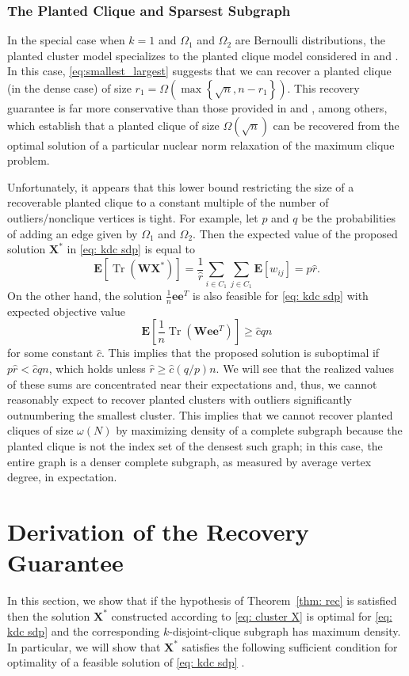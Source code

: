 \documentclass[twoside,11pt]{article}
\newcommand{\E}{\mathbf{E}}
\DeclareMathOperator{\tr}{{Tr}}
\newcommand{\e}{\bs {e}}
\newcommand{\bs}{\boldsymbol}
\newcommand{\X}{\bs {X}}
\newcommand{\W}{\bs {W}}
\newcommand{\0}{\bs{0}}
\newcommand{\sbra}[1] {\ensuremath{ \left[ #1\right]}} %
\newcommand{\rbra}[1]{\ensuremath{\left( #1 \right)}} %
\newcommand{\bra}[1]{\ensuremath{\left\{ #1 \right\}}} %
\newcommand{\kdc}{\(k\)-disjoint-clique }
\begin{document}
{\subsubsection{The Planted Clique and Sparsest Subgraph}

In the special case when $k=1$ and $\Omega_1$ and $\Omega_2$
are Bernoulli distributions, the planted cluster model 
specializes to the planted clique model considered in 
\cite{ames2011nuclear} and \cite{ames2015guaranteed}. 
In this case, \eqref{eq:smallest_largest}
suggests that we can recover a planted clique (in the dense
case) of size $r_1 = \Omega \rbra{ \max \bra{\sqrt{n}, n - r_1 } }$.
This recovery guarantee is far more conservative than those
provided in \cite{ames2011nuclear} and \cite{ames2015guaranteed},
among others,
which establish that a planted clique
of size $\Omega(\sqrt n)$ can be recovered from the optimal solution
of a particular nuclear norm relaxation of the maximum clique problem.

Unfortunately, it appears that this lower bound restricting the size
of a recoverable planted clique
to a constant multiple of the number of outliers/nonclique vertices
is tight. 
For example, let $p$ and $q$ be the probabilities of adding an edge 
given by $\Omega_1$ and $\Omega_2$.
Then the expected value of the proposed solution $\X^*$
in \eqref{eq: kdc sdp}
is equal to 
$$
	\E [ \tr(\W \X^*)] = \frac{1}{\hat r} \sum_{i \in C_1} \sum_{j \in C_1} 
		\E[w_{ij} ] = p \hat r.
$$
On the other hand, the solution $\frac{1}{n} \e\e^T$ is also
feasible for \eqref{eq: kdc sdp} with expected objective value
$$
	\E \sbra{ \frac{1}{n} \tr(\W \e\e^T) }
	 \ge \hat c q n
$$
for some constant $\hat c$.
This implies that the proposed solution is suboptimal if
$p \hat r < \hat c q n$, which holds unless $\hat r \ge \hat c (q/p) n$.
We will see that the realized values of these sums
are concentrated near their expectations and, thus, we cannot
reasonably expect to recover planted clusters with outliers significantly 
outnumbering the smallest cluster. This implies that we cannot
recover planted cliques of size $\omega(N)$ by maximizing
density of a complete subgraph because the planted clique
is not the index set of the densest such graph; in this case, the
entire graph is a denser
complete subgraph, as measured by average vertex degree,
in expectation.

\section{Derivation of the Recovery Guarantee}
\label{sec: proof}
In this section, we show that if the hypothesis of Theorem~\ref{thm: rec} is satisfied
then the solution \(\X^*\) constructed according to \eqref{eq: cluster X}
is optimal for \eqref{eq: kdc sdp} and the corresponding \kdc subgraph has maximum density.
In particular, we will show that \(\X^*\) satisfies
the following sufficient condition for optimality of a feasible solution of \eqref{eq: kdc sdp}
\citep[see][Theorem 4.1]{ames2014guaranteed}.


}
\end{document}
